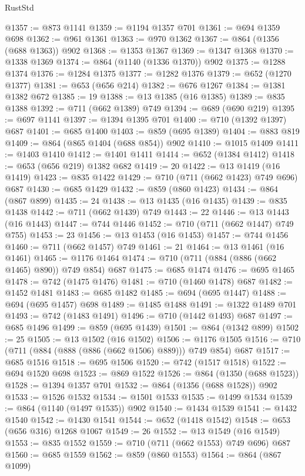 \begin{lexlean}{RustStd}
\begin{coremodule}
@1357 := @873 @1141
@1359 := @1194 @1357 @701
@1361 := @694 @1359 @698
@1362 := @961 @1361
@1363 := @970 @1362
@1367 := @864 (@1356 (@688 @1363)) @902
@1368 := @1353 @1367
@1369 := @1347 @1368
@1370 := @1338 @1369
@1374 := @864 (@1140 (@1336 @1370)) @902
@1375 := @1288 @1374
@1376 := @1284 @1375
@1377 := @1282 @1376
@1379 := @652 (@1270 @1377)
@1381 := @653 (@656 @214)
@1382 := @676 @1267
@1384 := @1381 @1382 @672
@1385 := 19
@1388 := @13 @1385 (@16 @1385)
@1389 := @835 @1388
@1392 := @711 (@662 @1389) @749
@1394 := @689 (@690 @219)
@1395 := @697 @1141
@1397 := @1394 @1395 @701
@1400 := @710 (@1392 @1397) @687
@1401 := @685 @1400
@1403 := @859 (@695 @1389)
@1404 := @883 @819
@1409 := @864 (@865 @1404 (@688 @854)) @902
@1410 := @1015 @1409
@1411 := @1403 @1410
@1412 := @1401 @1411
@1414 := @652 (@1384 @1412)
@1418 := @653 (@656 @219) @1382 @682
@1419 := 20
@1422 := @13 @1419 (@16 @1419)
@1423 := @835 @1422
@1429 := @710 (@711 (@662 @1423) @749 @696) @687
@1430 := @685 @1429
@1432 := @859 (@860 @1423)
@1434 := @864 (@867 @899)
@1435 := 24
@1438 := @13 @1435 (@16 @1435)
@1439 := @835 @1438
@1442 := @711 (@662 @1439) @749
@1443 := 22
@1446 := @13 @1443 (@16 @1443)
@1447 := @744 @1446
@1452 := @710 (@711 (@662 @1447) @749 @755)
@1453 := 23
@1456 := @13 @1453 (@16 @1453)
@1457 := @744 @1456
@1460 := @711 (@662 @1457) @749
@1461 := 21
@1464 := @13 @1461 (@16 @1461)
@1465 := @1176 @1464
@1474 := @710 (@711 (@884 (@886 (@662 @1465) @890)) @749 @854) @687
@1475 := @685 @1474
@1476 := @695 @1465
@1478 := @742 (@1475 @1476)
@1481 := @710 (@1460 @1478) @687
@1482 := @1452 @1481
@1483 := @685 @1482
@1485 := @694 (@695 @1447)
@1488 := @694 (@695 @1457) @698
@1489 := @1485 @1488
@1491 := @1322 @1489 @701
@1493 := @742 (@1483 @1491)
@1496 := @710 (@1442 @1493) @687
@1497 := @685 @1496
@1499 := @859 (@695 @1439)
@1501 := @864 (@1342 @899)
@1502 := 25
@1505 := @13 @1502 (@16 @1502)
@1506 := @1176 @1505
@1516 := @710 (@711 (@884 (@888 (@886 (@662 @1506) @889))) @749 @854) @687
@1517 := @685 @1516
@1518 := @695 @1506
@1520 := @742 (@1517 @1518)
@1522 := @694 @1520 @698
@1523 := @869 @1522
@1526 := @864 (@1350 (@688 @1523))
@1528 := @1394 @1357 @701
@1532 := @864 (@1356 (@688 @1528)) @902
@1533 := @1526 @1532
@1534 := @1501 @1533
@1535 := @1499 @1534
@1539 := @864 (@1140 (@1497 @1535)) @902
@1540 := @1434 @1539
@1541 := @1432 @1540
@1542 := @1430 @1541
@1544 := @652 (@1418 @1542)
@1548 := @653 (@656 @316) @1268 @1067
@1549 := 26
@1552 := @13 @1549 (@16 @1549)
@1553 := @835 @1552
@1559 := @710 (@711 (@662 @1553) @749 @696) @687
@1560 := @685 @1559
@1562 := @859 (@860 @1553)
@1564 := @864 (@867 @1099)

\end{coremodule}
\end{lexlean}
